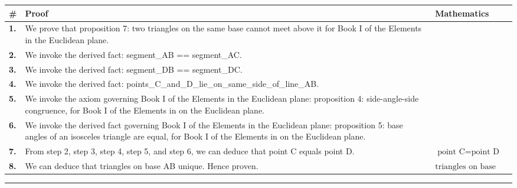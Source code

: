 \documentclass[11pt]{article}
\theoremstyle{definition}
\begin{document}
\begin{tabular}{@{} >{\raggedright\arraybackslash}p{} >{\raggedright\arraybackslash}p{} >{\raggedleft\arraybackslash}p{} @{}}
\textbf{\#} & \textbf{Proof} & \textbf{Mathematics} \\
\midrule
\textbf{1.} & We prove that proposition 7: two triangles on the same base cannot meet above it for Book I of the Elements in the Euclidean plane. & \\[0.45em]
\textbf{2.} & We invoke the derived fact: segment\_AB == segment\_AC. & \\[0.45em]
\textbf{3.} & We invoke the derived fact: segment\_DB == segment\_DC. & \\[0.45em]
\textbf{4.} & We invoke the derived fact: points\_C\_and\_D\_lie\_on\_same\_side\_of\_line\_AB. & \\[0.45em]
\textbf{5.} & We invoke the axiom governing Book I of the Elements in the Euclidean plane: proposition 4: side-angle-side congruence, for Book I of the Elements in on the Euclidean plane. & \\[0.45em]
\textbf{6.} & We invoke the derived fact governing Book I of the Elements in the Euclidean plane: proposition 5: base angles of an isosceles triangle are equal, for Book I of the Elements in on the Euclidean plane. & \\[0.45em]
\textbf{7.} & From step 2, step 3, step 4, step 5, and step 6, we can deduce that point C equals point D. & $\displaystyle \text{point C} = \text{point D}$ \\[0.45em]
\textbf{8.} & We can deduce that triangles on base AB unique. Hence proven. & $\displaystyle \text{triangles on base AB unique}$ \\[0.45em]
\bottomrule
\end{tabular}
\label{thm:Geometry-Euclid Book I-proposition_7_two_triangles_on_the_same_base_cannot_meet_above_it}
\par\medskip\hrule
\end{document}
